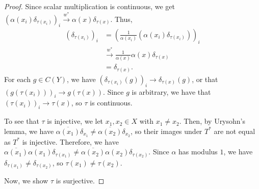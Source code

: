 \documentclass[10pt]{mypackage}
\begin{document}
\begin{proof}
  Since scalar multiplication is continuous, we get $\left( \alpha\left( x_i \right)\delta_{\tau\left( x_i \right)} \right)_i\xrightarrow{w^{\ast}}\alpha(x)\delta_{\tau(x)}$. Thus,
  \begin{align*}
    \left( \delta_{\tau\left( x_i \right)} \right)_{i} &= \left( \frac{1}{\alpha\left( x_i \right)}\left( \alpha\left( x_i \right)\delta_{\tau\left( x_i \right)} \right) \right)_{i}\\
                                                       &\xrightarrow{w^{\ast}} \frac{1}{\alpha\left( x \right)} \alpha(x)\delta_{\tau\left( x \right)}\\
                                                       &= \delta_{\tau\left( x \right)}.
  \end{align*}
  For each $g\in C(Y)$, we have $\left( \delta_{\tau\left( x_i \right)}\left( g \right) \right)_i \rightarrow \delta_{\tau(x)}(g)$, or that $\left( g\left( \tau\left( x_i \right) \right) \right)_{i}\rightarrow g\left( \tau\left( x \right) \right)$. Since $g$ is arbitrary, we have that $\left( \tau\left( x_i \right) \right)_i\rightarrow \tau\left( x \right)$, so $\tau$ is continuous.\newline

  To see that $\tau$ is injective, we let $x_1,x_2\in X$ with $x_1\neq x_2$. Then, by Urysohn's lemma, we have $\overline{\alpha\left( x_1 \right)}\delta_{x_1}\neq \overline{\alpha\left( x_2 \right)}\delta_{x_2}$, so their images under $T^{\ast}$ are not equal as $T^{\ast}$ is injective. Therefore, we have $\overline{\alpha\left( x_1 \right)}\alpha\left( x_1 \right)\delta_{\tau\left( x_1 \right)}\neq \overline{\alpha\left( x_2 \right)}\alpha\left( x_2 \right)\delta_{\tau\left( x_2 \right)}$. Since $\alpha$ has modulus $1$, we have $\delta_{\tau\left( x_1 \right)}\neq \delta_{\tau\left( x_2 \right)}$, so $\tau\left( x_1 \right)\neq \tau\left( x_2 \right)$.\newline

  Now, we show $\tau$ is surjective.
\end{proof}
\end{document}
